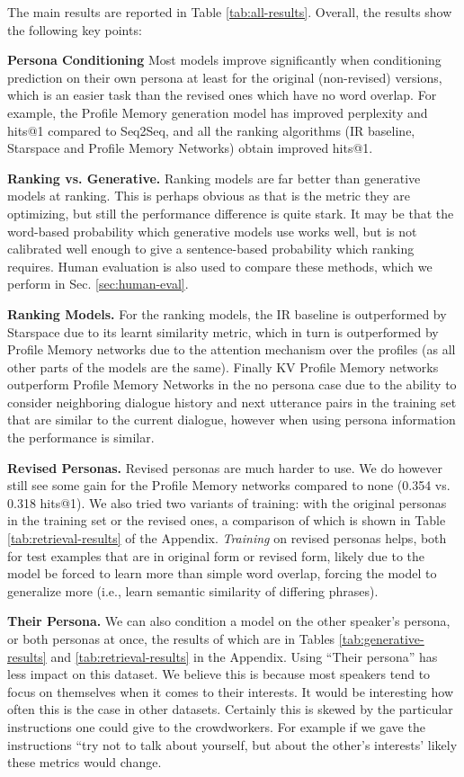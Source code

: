 \documentclass[11pt,a4paper]{article}
\begin{document}
The main results are reported in Table \ref{tab:all-results}.
Overall, the results show the following key points:

{\bf Persona Conditioning} Most models improve significantly when conditioning prediction on their own persona at least for the original (non-revised) versions, which is an easier task than the revised ones which have no word overlap. For example, the Profile Memory generation model has improved perplexity and hits@1 compared to Seq2Seq, and all the ranking algorithms (IR baseline, Starspace and Profile Memory Networks) obtain improved hits@1.


{\bf Ranking vs. Generative.} Ranking models are far better than generative models at ranking. This is perhaps obvious as that is the metric they are optimizing, but still the performance difference is quite stark. 
It may be that the word-based probability which generative models use works well, but is not calibrated well enough to give a sentence-based probability which ranking requires.
Human evaluation is also used to compare these methods, which we perform in Sec. \ref{sec:human-eval}.

{\bf Ranking Models.} For the ranking models, the IR baseline is outperformed by Starspace due to its learnt similarity metric, which in turn is outperformed by Profile Memory networks due to the attention mechanism over the profiles (as all other parts of the models are the same). Finally KV Profile Memory networks outperform Profile Memory Networks in the no persona case due to the ability to consider neighboring dialogue history and next utterance pairs in the training set that are similar to the current dialogue, however when using persona information the performance is similar. 


{\bf Revised Personas.} Revised personas are much harder to use. We do however still see some gain for the Profile Memory networks compared to none (0.354 vs. 0.318 hits@1). 
We also tried two variants of training: with the original personas in the training set or the revised ones, a comparison of which is shown in Table \ref{tab:retrieval-results} of the Appendix.  {\em Training} on revised personas helps, both for test examples that are in original form or revised form, likely due to the model be forced to learn more than simple word overlap, forcing the model to generalize more (i.e., learn semantic similarity of differing phrases).

{\bf Their Persona.} We can also condition a model on the other speaker's persona, or both personas
at once, the results of which are in Tables \ref{tab:generative-results}
and \ref{tab:retrieval-results} in the Appendix.
Using ``Their persona'' has less impact on this dataset. We believe this is because most speakers tend to focus on themselves when it comes to their interests. It would be interesting how often this is the case in other datasets. Certainly this is skewed by the particular instructions one could give to the crowdworkers. For example if we gave the instructions ``try not to talk about yourself, but about the other's interests' likely these metrics would change.
\end{document}
